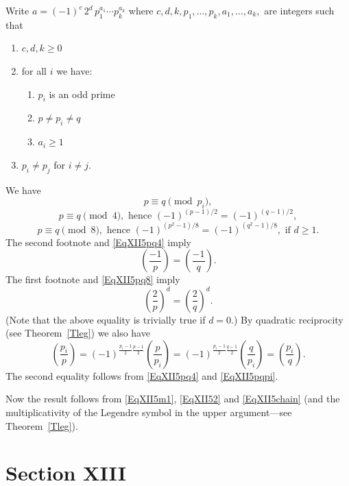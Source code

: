\documentclass[12pt,letterpaper]{article}
\theoremstyle{definition}
\begin{document}
Write $a=(-1)^c\,2^d\,p_1^{a_1}\cdots p_k^{a_k}$ where $c,d,k,p_1,\ldots,p_k,a_1,\ldots,a_k,$ are integers such that 
\begin{enumerate}
    \item $c,d,k\ge0$
    \item for all $i$ we have:
    \begin{enumerate}
        \item $p_i$ is an odd prime
        \item $p\ne p_i\ne q$
        \item $a_i\ge1$
    \end{enumerate}
    \item $p_i\ne p_j$ for $i\ne j$.
\end{enumerate} 
We have 
\begin{equation}\label{EqXII5pqpi}
p\equiv q\pmod{p_i},
\end{equation} 
\begin{equation}\label{EqXII5pq4}
p\equiv q\pmod{4},\text{ hence }(-1)^{(p-1)/2}=(-1)^{(q-1)/2},
\end{equation}
\begin{equation}\label{EqXII5pq8}
p\equiv q\pmod{8},\text{ hence }(-1)^{(p^2-1)/8}=(-1)^{(q^2-1)/8},\text{ if }d\ge1.
\end{equation} 
The second footnote and \eqref{EqXII5pq4} imply 
\begin{equation}\label{EqXII5m1}
\left(\frac{-1}{p}\right)=\left(\frac{-1}{q}\right).
\end{equation} 
The first footnote and \eqref{EqXII5pq8} imply 
\begin{equation}\label{EqXII52}
\left(\frac{2}{p}\right)^d=\left(\frac{2}{q}\right)^d.
\end{equation} 
(Note that the above equality is trivially true if $d=0$.) By quadratic reciprocity (see Theorem~\ref{Tleg}) we also have 
\begin{equation}\label{EqXII5chain}
\left(\frac{p_i}{p}\right)=(-1)^{\frac{p_i-1}{2}\frac{p-1}{2}}\left(\frac{p}{p_i}\right)=(-1)^{\frac{p_i-1}{2}\frac{q-1}{2}}\left(\frac{q}{p_i}\right)=\left(\frac{p_i}{q}\right).
\end{equation} 
The second equality follows from \eqref{EqXII5pq4} and \eqref{EqXII5pqpi}. 

Now the result follows from \eqref{EqXII5m1}, \eqref{EqXII52} and \eqref{EqXII5chain} (and the multiplicativity of the Legendre symbol in the upper argument---see Theorem~\ref{Tleg}). 

\section{Section XIII} %
\end{document}
